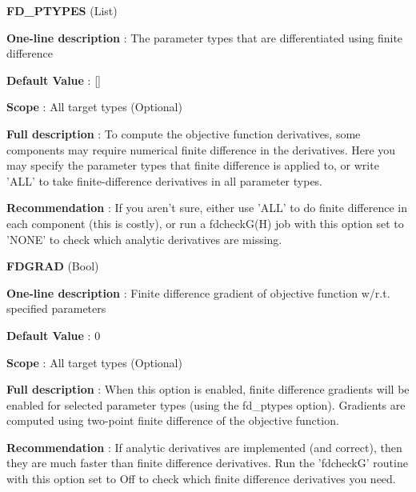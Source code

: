 \begin{DoxyItemize}
\item {\bfseries  F\-D\-\_\-\-P\-T\-Y\-P\-E\-S } (List) \par
{\bfseries  One-\/line description }\-: The parameter types that are differentiated using finite difference \par
{\bfseries  Default Value }\-: \mbox{[}\mbox{]} \par
{\bfseries  Scope }\-: All target types (Optional) \par
{\bfseries  Full description }\-: To compute the objective function derivatives, some components may require numerical finite difference in the derivatives. Here you may specify the parameter types that finite difference is applied to, or write 'A\-L\-L' to take finite-\/difference derivatives in all parameter types. \par
{\bfseries  Recommendation }\-: If you aren't sure, either use 'A\-L\-L' to do finite difference in each component (this is costly), or run a fdcheck\-G(\-H) job with this option set to 'N\-O\-N\-E' to check which analytic derivatives are missing.\end{DoxyItemize}
\begin{DoxyItemize}
\item {\bfseries  F\-D\-G\-R\-A\-D } (Bool) \par
{\bfseries  One-\/line description }\-: Finite difference gradient of objective function w/r.\-t. specified parameters \par
{\bfseries  Default Value }\-: 0 \par
{\bfseries  Scope }\-: All target types (Optional) \par
{\bfseries  Full description }\-: When this option is enabled, finite difference gradients will be enabled for selected parameter types (using the fd\-\_\-ptypes option). Gradients are computed using two-\/point finite difference of the objective function. \par
{\bfseries  Recommendation }\-: If analytic derivatives are implemented (and correct), then they are much faster than finite difference derivatives. Run the 'fdcheck\-G' routine with this option set to Off to check which finite difference derivatives you need.\end{DoxyItemize}
